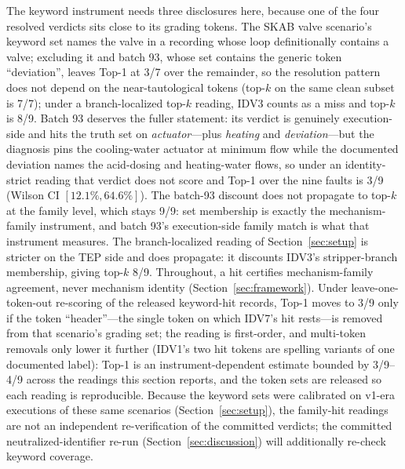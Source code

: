 \documentclass[preprint,10pt]{elsarticle}
\begin{document}
The keyword instrument needs three disclosures here, because one of the four resolved verdicts sits close to its grading tokens. The SKAB valve scenario's keyword set names the valve in a recording whose loop definitionally contains a valve; excluding it and batch 93, whose set contains the generic token ``deviation'', leaves Top-1 at 3/7 over the remainder, so the resolution pattern does not depend on the near-tautological tokens (top-$k$ on the same clean subset is 7/7); under a branch-localized top-$k$ reading, IDV3 counts as a miss and top-$k$ is 8/9. Batch 93 deserves the fuller statement: its verdict is genuinely execution-side and hits the truth set on \emph{actuator}---plus \emph{heating} and \emph{deviation}---but the diagnosis pins the cooling-water actuator at minimum flow while the documented deviation names the acid-dosing and heating-water flows, so under an identity-strict reading that verdict does not score and Top-1 over the nine faults is 3/9 (Wilson CI $[12.1\%,64.6\%]$). The batch-93 discount does not propagate to top-$k$ at the family level, which stays 9/9: set membership is exactly the mechanism-family instrument, and batch 93's execution-side family match is what that instrument measures. The branch-localized reading of Section~\ref{sec:setup} is stricter on the TEP side and does propagate: it discounts IDV3's stripper-branch membership, giving top-$k$ 8/9. Throughout, a hit certifies mechanism-family agreement, never mechanism identity (Section~\ref{sec:framework}). Under leave-one-token-out re-scoring of the released keyword-hit records, Top-1 moves to 3/9 only if the token ``header''---the single token on which IDV7's hit rests---is removed from that scenario's grading set; the reading is first-order, and multi-token removals only lower it further (IDV1's two hit tokens are spelling variants of one documented label): Top-1 is an instrument-dependent estimate bounded by 3/9--4/9 across the readings this section reports, and the token sets are released so each reading is reproducible. Because the keyword sets were calibrated on v1-era executions of these same scenarios (Section~\ref{sec:setup}), the family-hit readings are not an independent re-verification of the committed verdicts; the committed neutralized-identifier re-run (Section~\ref{sec:discussion}) will additionally re-check keyword coverage.
\end{document}
